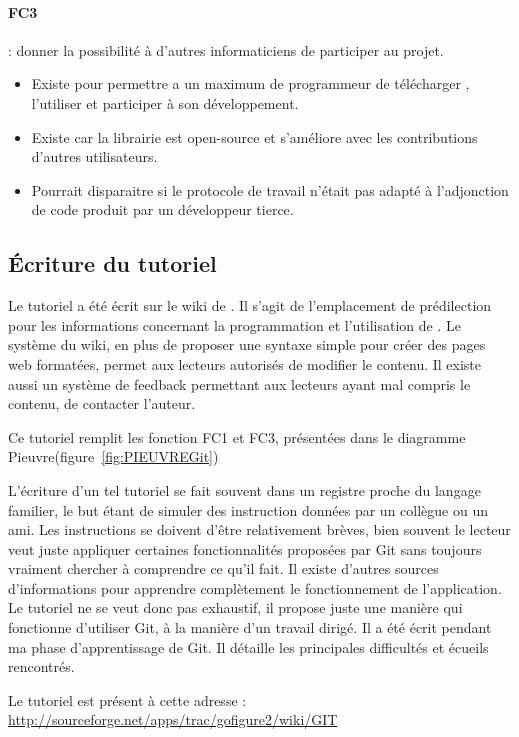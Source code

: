 \paragraph*{FC3} : donner la possibilité à d'autres informaticiens de participer au projet.
\begin{itemize}
  \item Existe pour permettre a un maximum de programmeur de télécharger {\gofigure}, l'utiliser et participer à son développement.
  \item Existe car la librairie est open-source et s'améliore avec les contributions d'autres utilisateurs.
  \item Pourrait disparaitre si le protocole de travail n'était pas adapté à l'adjonction de code produit par un développeur tierce.
\end{itemize}


\subsection{Écriture du tutoriel}

Le tutoriel a été écrit sur le wiki de \gofigure. Il s'agit de l'emplacement de prédilection pour les informations 
concernant la programmation et l'utilisation de {\gofigure}. Le système du wiki, en plus de proposer une syntaxe simple 
pour créer des pages web formatées, permet aux lecteurs autorisés de modifier le contenu. 
Il existe aussi un système de feedback permettant aux lecteurs ayant mal compris le contenu, de contacter l'auteur.

Ce tutoriel remplit les fonction FC1 et FC3, présentées dans le diagramme Pieuvre(figure~\ref{fig:PIEUVREGit})

L'écriture d'un tel tutoriel se fait souvent dans un registre proche du langage familier,
le but étant de simuler des instruction données par un collègue ou un ami. 
Les instructions se doivent d'être relativement brèves, bien souvent le lecteur veut juste appliquer certaines fonctionnalités 
proposées par Git sans toujours vraiment chercher à comprendre ce qu'il fait. 
Il existe d'autres sources d'informations pour apprendre complètement le fonctionnement de l'application.
Le tutoriel ne se veut donc pas exhaustif, il propose juste une manière qui fonctionne d'utiliser Git,
à la manière d'un travail dirigé. Il a été écrit pendant ma phase d'apprentissage de Git. 
Il détaille les principales difficultés et écueils rencontrés. 

Le tutoriel est présent à cette adresse : \\
\url{http://sourceforge.net/apps/trac/gofigure2/wiki/GIT}

